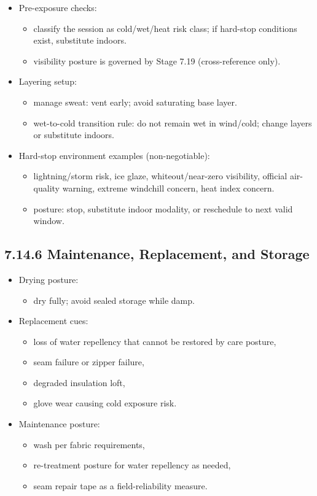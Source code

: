 \documentclass[10pt]{article}
\begin{document}
\begin{itemize}
\item Pre-exposure checks:
  \begin{itemize}
  \item classify the session as cold/wet/heat risk class; if hard-stop conditions exist, substitute indoors.
  \item visibility posture is governed by Stage 7.19 (cross-reference only).
  \end{itemize}
\item Layering setup:
  \begin{itemize}
  \item manage sweat: vent early; avoid saturating base layer.
  \item wet-to-cold transition rule: do not remain wet in wind/cold; change layers or substitute indoors.
  \end{itemize}
\item Hard-stop environment examples (non-negotiable):
  \begin{itemize}
  \item lightning/storm risk, ice glaze, whiteout/near-zero visibility, official air-quality warning, extreme windchill concern, heat index concern.
  \item posture: stop, substitute indoor modality, or reschedule to next valid window.
  \end{itemize}
\end{itemize}

\subsection*{7.14.6 Maintenance, Replacement, and Storage}
{}

\begin{itemize}
\item Drying posture:
  \begin{itemize}
  \item dry fully; avoid sealed storage while damp.
  \end{itemize}
\item Replacement cues:
  \begin{itemize}
  \item loss of water repellency that cannot be restored by care posture,
  \item seam failure or zipper failure,
  \item degraded insulation loft,
  \item glove wear causing cold exposure risk.
  \end{itemize}
\item Maintenance posture:
  \begin{itemize}
  \item wash per fabric requirements,
  \item re-treatment posture for water repellency as needed,
  \item seam repair tape as a field-reliability measure.
  \end{itemize}
\end{itemize}
\end{document}
